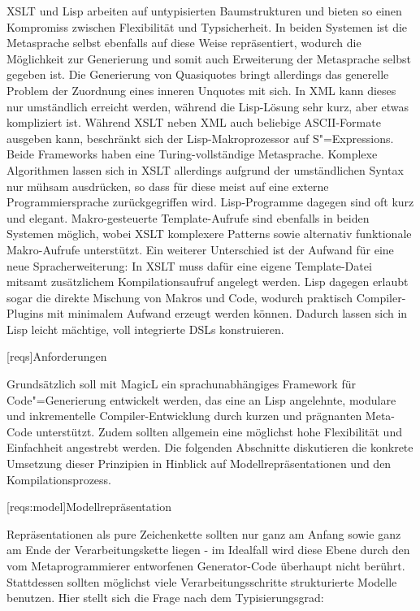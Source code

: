 \documentclass[11pt, a4paper, bibgerm]{scrbook}
\newcommand\lchapter{}
\newcommand\lsection{}
\newcommand{\sexps}{S"=Expressions}
\newcommand{\cgen}{Code"=Generierung}
\begin{document}
XSLT und Lisp arbeiten auf untypisierten Baumstrukturen und bieten so
einen Kompromiss zwischen Flexibilität und Typsicherheit. In beiden
Systemen ist die Metasprache selbst ebenfalls auf diese Weise
repräsentiert, wodurch die Möglichkeit zur Generierung und somit auch
Erweiterung der Metasprache selbst gegeben ist. Die Generierung von
Quasiquotes bringt allerdings das generelle Problem der Zuordnung eines
inneren Unquotes mit sich. In XML kann dieses nur umständlich erreicht
werden, während die Lisp-Lösung sehr kurz, aber etwas kompliziert
ist. Während XSLT neben XML auch beliebige ASCII-Formate ausgeben kann,
beschränkt sich der Lisp-Makroprozessor auf \sexps{}. Beide Frameworks
haben eine Turing-vollständige Metasprache. Komplexe Algorithmen lassen
sich in XSLT allerdings aufgrund der umständlichen Syntax nur mühsam
ausdrücken, so dass für diese meist auf eine externe Programmiersprache
zurückgegriffen wird. Lisp-Programme dagegen sind oft kurz und
elegant. Makro-gesteuerte Template-Aufrufe sind ebenfalls in beiden
Systemen möglich, wobei XSLT komplexere Patterns sowie alternativ
funktionale Makro-Aufrufe unterstützt. Ein weiterer Unterschied ist der
Aufwand für eine neue Spracherweiterung: In XSLT muss dafür eine eigene
Template-Datei mitsamt zusätzlichem Kompilationsaufruf angelegt
werden. Lisp dagegen erlaubt sogar die direkte Mischung von Makros und
Code, wodurch praktisch Compiler-Plugins mit minimalem Aufwand erzeugt
werden können. Dadurch lassen sich in Lisp leicht mächtige, voll
integrierte DSLs konstruieren.

\lchapter[reqs]{Anforderungen}

Grundsätzlich soll mit MagicL ein sprachunabhängiges Framework für
\cgen{} entwickelt werden, das eine an Lisp angelehnte, modulare und
inkrementelle Compiler-Entwicklung durch kurzen und prägnanten Meta-Code
unterstützt. Zudem sollten allgemein eine möglichst hohe Flexibilität
und Einfachheit angestrebt werden. Die folgenden Abschnitte diskutieren
die konkrete Umsetzung dieser Prinzipien in Hinblick auf
Modellrepräsentationen und den Kompilationsprozess.

\lsection[reqs:model]{Modellrepräsentation}

Repräsentationen als pure Zeichenkette sollten nur ganz am Anfang sowie
ganz am Ende der Verarbeitungskette liegen - im Idealfall wird diese
Ebene durch den vom Metaprogrammierer entworfenen Generator-Code
überhaupt nicht berührt. Stattdessen sollten möglichst viele
Verarbeitungsschritte strukturierte Modelle benutzen. Hier stellt
sich die Frage nach dem Typisierungsgrad:
\end{document}

